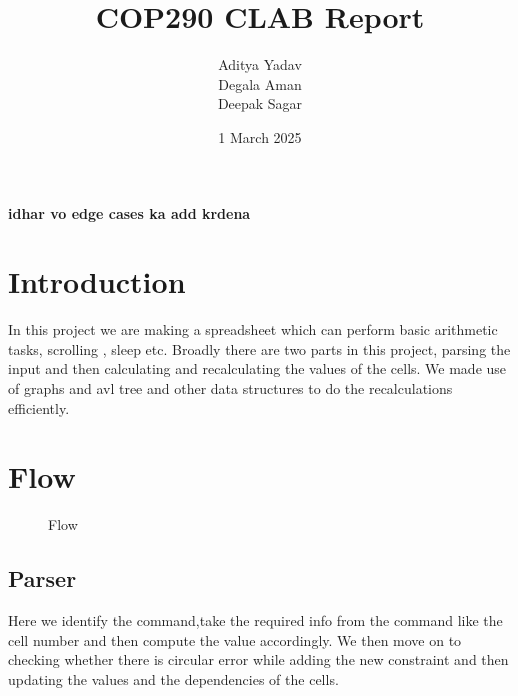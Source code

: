 \documentclass{article}
\title{COP290 CLAB Report}
\author{Aditya Yadav \\ Degala Aman \\ Deepak Sagar}
\date{1 March 2025}
\begin{document}
\maketitle
\textbf{idhar vo edge cases ka add krdena}

\section{Introduction}
In this project we are making a spreadsheet which can perform basic arithmetic tasks, scrolling , sleep etc. Broadly there are two parts in this project, parsing the input and then calculating and recalculating the values of the cells. We made use of graphs and avl tree and other data structures to do the recalculations efficiently.


\section{Flow}
\begin{figure}
    \centering
    \caption{Flow}
    \label{fig:1}
\end{figure}
\subsection{Parser}
Here we identify the command,take the required info from the command like the cell number and then compute the value accordingly.
We then move on to checking whether there is circular error while adding the new constraint and then updating the values and the dependencies of the cells.
\end{document}

